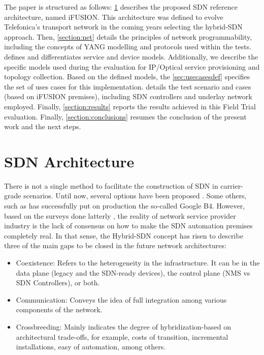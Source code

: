 \documentclass[a4paper,fleqn]{cas-dc}
\begin{document}
The paper is structured as follows: \cref{section:arq} describes the proposed SDN reference architecture, named iFUSION. This architecture was defined to evolve Telefonica's transport network in the coming years selecting the hybrid-SDN approach. Then, \cref{section:net} details the principles of network programmability, including the concepts of YANG modelling and protocols used within the tests.  defines and differentiates service and device models. Additionally, we describe the specific models used during the evaluation for IP/Optical service provisioning and topology collection. Based on the defined models, the \cref{sec:usecasesdef} specifies the set of uses cases for this implementation.  details the test scenario and cases (based on iFUSION premises), including SDN controllers and underlay network employed. Finally, \cref{section:results} reports the results achieved in this Field Trial evaluation. Finally, \cref{section:conclusions} resumes the conclusion of the present work and the next steps.

\section{SDN Architecture}
\label{section:arq}

There is not a single method to facilitate the construction of SDN in carrier-grade scenarios. Until now, several options have been proposed \cite{bakshi2013considerations,karakus2017survey,birk2016evolving}. Some others, such as \cite{jain2013b4} has successfully put on production the so-called Google B4. However, based on the surveys done latterly \cite{campbell1999survey,sinha2017survey,boucadair2014software}, the reality of network service provider industry is the lack of consensus on how to make the SDN automation premises completely real. In that sense, the Hybrid-SDN concept has risen to describe three of the main gaps to be closed in the future network architectures:
\begin{itemize}
    \item Coexistence: Refers to the heterogeneity in the infrastructure. It can be in the data plane (legacy and the SDN-ready devices), the control plane (NMS vs SDN Controllers), or both. 
    \item Communication: Conveys the idea of full integration among various components of the network.
    \item Crossbreeding: Mainly indicates the degree of hybridization-based on architectural trade-offs, for example, costs of transition, incremental installations, easy of automation, among others. 
\end{itemize}
\end{document}
